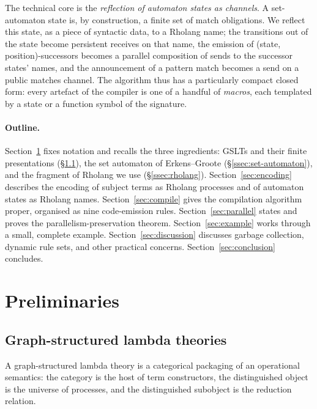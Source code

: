 \documentclass[11pt]{article}
\theoremstyle{plain}
\theoremstyle{definition}
\theoremstyle{remark}
\begin{document}
The technical core is the \emph{reflection of automaton states as channels}.
A set-automaton state is, by construction, a finite set of match obligations.
We reflect this state, as a piece of syntactic data, to a Rholang name; the
transitions out of the state become persistent receives on that name, the
emission of (state, position)-successors becomes a parallel composition of
sends to the successor states' names, and the announcement of a pattern
match becomes a send on a public matches channel. The algorithm thus has a
particularly compact closed form: every artefact of the compiler is one of a
handful of \emph{macros}, each templated by a state or a function symbol of
the signature.

\paragraph{Outline.}
Section~\ref{sec:prelim} fixes notation and recalls the three ingredients:
GSLTs and their finite presentations (\S\ref{ssec:gslt}), the set automaton
of Erkens--Groote (\S\ref{ssec:set-automaton}), and the fragment of Rholang
we use (\S\ref{ssec:rholang}). Section~\ref{sec:encoding} describes the
encoding of subject terms as Rholang processes and of automaton states as
Rholang names. Section~\ref{sec:compile} gives the compilation algorithm
proper, organised as nine code-emission rules. Section~\ref{sec:parallel}
states and proves the parallelism-preservation theorem.
Section~\ref{sec:example} works through a small, complete example.
Section~\ref{sec:discussion} discusses garbage collection, dynamic rule
sets, and other practical concerns. Section~\ref{sec:conclusion} concludes.

\section{Preliminaries}\label{sec:prelim}

\subsection{Graph-structured lambda theories}\label{ssec:gslt}

A graph-structured lambda theory is a categorical packaging of an operational
semantics: the category is the host of term constructors, the
distinguished object is the universe of processes, and the distinguished
subobject is the reduction relation.
\end{document}

